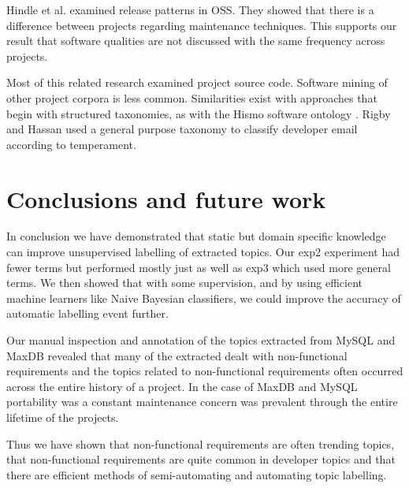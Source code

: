 \documentclass{acm_proc_article-sp}
\begin{document}
Hindle et al. \cite{Hindle2007} examined release patterns in OSS. They showed that there is a difference between projects regarding maintenance techniques. This supports our result that software qualities are not discussed with the same frequency across projects.

Most of this related research examined project source code. Software mining of other project corpora is less common. Similarities exist with approaches that begin with structured taxonomies, as with the Hismo software ontology \cite{girba06}. Rigby and Hassan \cite{rigby07msr} used a general purpose taxonomy to classify developer email according to temperament.

\section{Conclusions and future work}

%


In conclusion we have demonstrated that static but domain specific knowledge can improve unsupervised labelling of extracted topics. Our \textsf{exp2} experiment had fewer terms but performed mostly just as well as \textsf{exp3} which used more general terms. We then showed that with some supervision, and by using efficient machine learners like Naive Bayesian classifiers, we could improve the accuracy of automatic labelling event further.

Our manual inspection and annotation of the topics extracted from MySQL and MaxDB revealed that many of the extracted dealt with non-functional requirements and the topics related to non-functional requirements often occurred across the entire history of a project. In the case of MaxDB and MySQL portability was a constant maintenance concern was prevalent through the entire lifetime of the projects.

Thus we have shown that non-functional requirements are often trending topics, that non-functional requirements are quite common in developer topics and that there are efficient methods of semi-automating and automating topic labelling.
\end{document}

